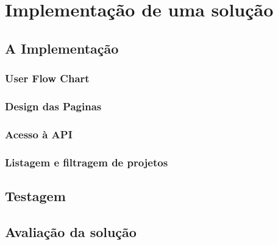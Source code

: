 \chapter{Implementação de uma solução}

\section{A Implementação}

\subsection{User Flow Chart}

\subsection{Design das Paginas}

\subsection{Acesso à API}

\subsection{Listagem e filtragem de projetos}



\section{Testagem}

\section{Avaliação da solução}